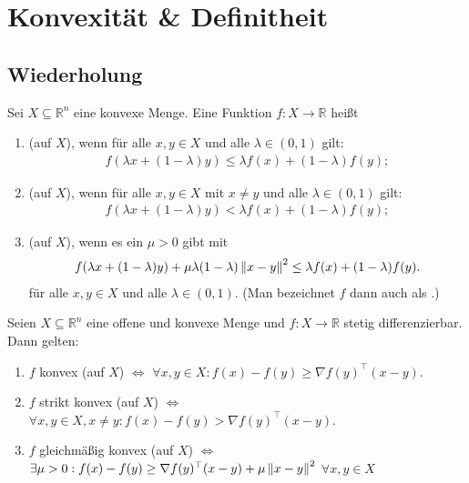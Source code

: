 \chapter{Konvexität \& Definitheit}


\newcommand{\dd}{\textnormal{d}}
\newcommand\red[1]{\textcolor{red}{#1}}

\section{Wiederholung}

\begin{definition}\label{def3.2}%
	Sei $X\subseteq\mathbb{R}^n$ eine konvexe Menge. Eine Funktion
	$f\colon X\to\mathbb{R}$ heißt
	\begin{enumerate}[label=(\alph*), leftmargin=*]
		\item {} (auf $X$), wenn für alle $x,y\in X$ und alle
		$\lambda\in(0,1)$ gilt:
		\begin{align*}
		f(\lambda x+(1-\lambda)y)\leq\lambda f(x) + (1-\lambda)f(y);
		\end{align*}
		\item {} (auf $X$), wenn für alle $x,y\in X$ mit
		$x\neq y$ und alle $\lambda\in(0,1)$ gilt:
		\begin{align*}
		f(\lambda x+(1-\lambda)y)<\lambda f(x) + (1-\lambda)f(y);
		\end{align*}
		\item {} (auf $X$), wenn es ein $\mu>0$
		gibt mit
		\begin{align*}
		f(\lambda x+(1-\lambda)y) + \mu\lambda(1-\lambda)\left\lVert x-y \right\rVert^2\leq\lambda f(x) + (1-\lambda)f(y).
		\end{align*}
		für alle $x,y\in X$ und alle $\lambda\in(0,1)$.
		(Man bezeichnet $f$ dann auch als .)
	\end{enumerate}
\end{definition}

\begin{satz}\label{satz3.5}%
	Seien $X\subseteq\mathbb{R}^n$ eine offene und konvexe Menge und
	$f\colon X\to\mathbb{R}$ stetig differenzierbar. Dann gelten:
	\begin{enumerate}[label=(\alph*), leftmargin=*, nolistsep]
		\item $f$ konvex (auf $X$) $\Longleftrightarrow$ $\forall x,y \in X: f(x)-f(y)\geq \nabla f(y)^\top(x-y)$.
		\item $f$ strikt konvex (auf $X$) $\Longleftrightarrow$ $\forall x,y\in X,x\neq y: f(x)-f(y)>\nabla f(y)^\top(x-y)$.
		\item $f$ gleichmäßig konvex (auf $X$) $\Longleftrightarrow$ $\exists \mu>0:f(x)-f(y)\geq \nabla f(y)^\top(x-y) + \mu\left\lVert x-y \right\rVert^2$ $\forall x,y\in X$
	\end{enumerate}
\end{satz}

